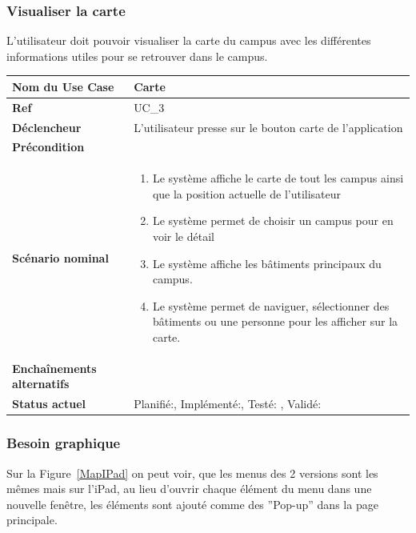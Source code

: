 		\subsubsection{Visualiser la carte}
					L'utilisateur doit pouvoir visualiser la carte du campus avec les différentes informations utiles pour se retrouver dans le campus.\\[0.2cm]
					\begin{longtable}{|l|p{10cm}|}
						\hline \textbf{Nom du Use Case} & Carte \\ 
						\hline \textbf{Ref} & UC\_3  \\ 
						\hline \textbf{Déclencheur} & L'utilisateur presse sur le bouton carte de l'application \\
						\hline \textbf{Précondition} &  \\
						\hline \textbf{Scénario nominal} & 
						\begin{enumerate}
							\item Le système affiche le carte de tout les campus ainsi que la position actuelle de l'utilisateur
							\item Le système permet de choisir un campus pour en voir le détail
							\item Le système affiche les bâtiments principaux du campus.
							\item Le système permet de naviguer, sélectionner des bâtiments ou une personne pour les afficher sur la carte.
						\end{enumerate}
						\\ 
						\hline \textbf{Enchaînements alternatifs} & \\
						\hline \textbf{Status actuel} & Planifié:\CheckedBox , Implémenté:\CheckedBox  , Testé: \CheckedBox  , Validé: \CheckedBox  \\
						\hline 
					\end{longtable} 
			\subsubsection*{Besoin graphique}

					Sur la Figure~\ref{MapIPad} on peut voir, que les menus des 2 versions sont les mêmes mais sur l'iPad, au lieu d'ouvrir chaque élément du menu dans une nouvelle fenêtre, les éléments sont ajouté comme des ''Pop-up'' dans la page principale.

